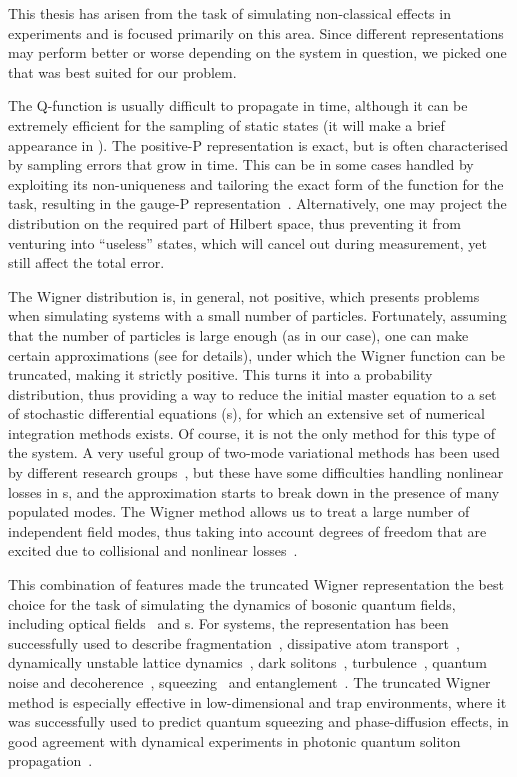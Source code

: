This thesis has arisen from the task of simulating non-classical effects in  experiments and is focused primarily on this area.
Since different representations may perform better or worse depending on the system in question, we picked one that was best suited for our problem.

The Q-function is usually difficult to propagate in time, although it can be extremely efficient for the sampling of static states (it will make a brief appearance in ).
The positive-P representation is exact, but is often characterised by sampling errors that grow in time.
This can be in some cases handled by exploiting its non-uniqueness and tailoring the exact form of the function for the task, resulting in the gauge-P representation~\cite{Deuar2002}.
Alternatively, one may project the distribution on the required part of Hilbert space, thus preventing it from venturing into ``useless'' states, which will cancel out during measurement, yet still affect the total error.

The Wigner distribution is, in general, not positive, which presents problems when simulating systems with a small number of particles.
Fortunately, assuming that the number of particles is large enough (as in our case), one can make certain approximations (see  for details), under which the Wigner function can be truncated, making it strictly positive.
This turns it into a probability distribution, thus providing a way to reduce the initial master equation to a set of stochastic differential equations (s), for which an extensive set of numerical integration methods exists.
Of course, it is not the only method for this type of the system.
A very useful group of two-mode variational methods has been used by different research groups~\cite{Li2008,Li2009,Sinatra2011}, but these have some difficulties handling nonlinear losses in s, and the approximation starts to break down in the presence of many populated modes.
The Wigner method allows us to treat a large number of independent field modes, thus taking into account degrees of freedom that are excited due to collisional and nonlinear losses~\cite{Norrie2005,Deuar2007}.

This combination of features made the truncated Wigner representation the best choice for the task of simulating the dynamics of bosonic quantum fields, including optical fields~\cite{Drummond1993,Drummond1993a,Corney2006,Corney2008} and s.
For  systems, the representation has been successfully used to describe fragmentation~\cite{Isella2005,Isella2006,Gross2011}, dissipative atom transport~\cite{Ruostekoski2005}, dynamically unstable lattice dynamics~\cite{Shrestha2009}, dark solitons~\cite{Martin2010,Martin2010a}, turbulence~\cite{Norrie2005,Norrie2006}, quantum noise and decoherence~\cite{Steel1998,Norrie2006a,Egorov2011}, squeezing~\cite{Opanchuk2012} and entanglement~\cite{Opanchuk2012a}.
The truncated Wigner method is especially effective in low-dimensional and trap environments, where it was successfully used to predict quantum squeezing and phase-diffusion effects, in good agreement with dynamical experiments in photonic quantum soliton propagation~\cite{Carter1987,Corney2008}.

